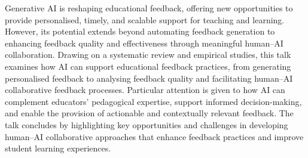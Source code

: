 Generative AI is reshaping educational feedback, offering new opportunities to provide personalised, timely, and scalable support for teaching and learning. However, its potential extends beyond automating feedback generation to enhancing feedback quality and effectiveness through meaningful human--AI collaboration. Drawing on a systematic review and empirical studies, this talk examines how AI can support educational feedback practices, from generating personalised feedback to analysing feedback quality and facilitating human--AI collaborative feedback processes. Particular attention is given to how AI can complement educators' pedagogical expertise, support informed decision-making, and enable the provision of actionable and contextually relevant feedback. The talk concludes by highlighting key opportunities and challenges in developing human--AI collaborative approaches that enhance feedback practices and improve student learning experiences.
